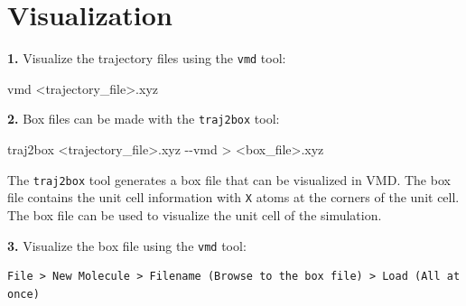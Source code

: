 \documentclass[
  letterpaper,
  DIV=11,
  numbers=noendperiod]{scrreprt}
\newenvironment{Shaded}{\begin{snugshade}}{\end{snugshade}}
\newcommand{\AttributeTok}[1]{\textcolor[rgb]{0.40,0.45,0.13}{#1}}
\newcommand{\ExtensionTok}[1]{\textcolor[rgb]{0.00,0.23,0.31}{#1}}
\newcommand{\NormalTok}[1]{\textcolor[rgb]{0.00,0.23,0.31}{#1}}
\newcommand{\OperatorTok}[1]{\textcolor[rgb]{0.37,0.37,0.37}{#1}}
\begin{document}
\hypertarget{visualization}{%
\section*{Visualization}\label{visualization}}


\textbf{1.} Visualize the trajectory files using the \texttt{vmd} tool:

\begin{Shaded}
\begin{Highlighting}[]
\ExtensionTok{vmd} \OperatorTok{\textless{}}\NormalTok{trajectory\_file}\OperatorTok{\textgreater{}}\NormalTok{.xyz}
\end{Highlighting}
\end{Shaded}

\textbf{2.} Box files can be made with the \texttt{traj2box} tool:

\begin{Shaded}
\begin{Highlighting}[]
\ExtensionTok{traj2box} \OperatorTok{\textless{}}\NormalTok{trajectory\_file}\OperatorTok{\textgreater{}}\NormalTok{.xyz }\AttributeTok{{-}{-}vmd} \OperatorTok{\textgreater{}} \OperatorTok{\textless{}}\NormalTok{box\_file}\OperatorTok{\textgreater{}}\NormalTok{.xyz}
\end{Highlighting}
\end{Shaded}

\begin{tcolorbox}[enhanced jigsaw, title=\textcolor{quarto-callout-note-color}{\faInfo}\hspace{0.5em}{Note}, colbacktitle=quarto-callout-note-color!10!white, bottomtitle=1mm, breakable, colframe=quarto-callout-note-color-frame, toprule=.15mm, opacitybacktitle=0.6, bottomrule=.15mm, titlerule=0mm, arc=.35mm, rightrule=.15mm, toptitle=1mm, coltitle=black, left=2mm, opacityback=0, colback=white, leftrule=.75mm]

The \texttt{traj2box} tool generates a box file that can be visualized
in VMD. The box file contains the unit cell information with \texttt{X}
atoms at the corners of the unit cell. The box file can be used to
visualize the unit cell of the simulation.

\end{tcolorbox}

\textbf{3.} Visualize the box file using the \texttt{vmd} tool:

\begin{verbatim}
File > New Molecule > Filename (Browse to the box file) > Load (All at once)
\end{verbatim}
\end{document}
